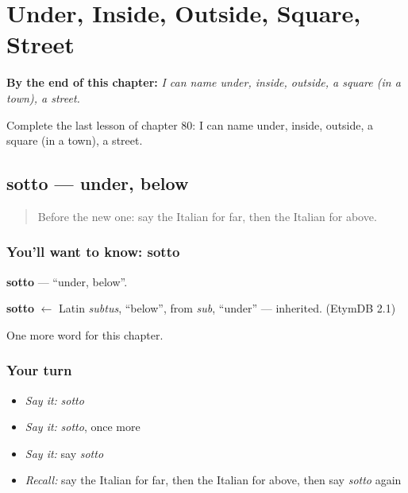 
\chapter{Under, Inside, Outside, Square, Street}
\label{ch:it-under-inside-outside-square-street}

\begin{chapteropening}
\textbf{By the end of this chapter:} \emph{I can name under, inside, outside, a square (in a town), a street.}

Complete the last lesson of chapter 80: I can name under, inside, outside, a square (in a town), a street.
\end{chapteropening}

\section[sotto]{sotto — under, below}

\label{lesson:IT-C80-sotto}



\begin{quote}
Before the new one: say the Italian for far, then the Italian for above.
\end{quote}

\subsection*{You'll want to know: sotto}
\textbf{sotto} — \textquotedblleft{}under, below\textquotedblright{}.

\begin{cousinweb}
\textbf{sotto} $\leftarrow$ Latin \emph{subtus}, \textquotedblleft{}below\textquotedblright{}, from \emph{sub}, \textquotedblleft{}under\textquotedblright{} — inherited. (EtymDB 2.1)
\end{cousinweb}

\begin{grammarlens}[title={What you've built}]
One more word for this chapter.
\end{grammarlens}

\subsection*{Your turn}
\begin{itemize}
\raggedright
  \item \emph{Say it:} \emph{sotto}
  \item \emph{Say it:} \emph{sotto}, once more
  \item \emph{Say it:} say \emph{sotto}
  \item \emph{Recall:} say the Italian for far, then the Italian for above, then say \emph{sotto} again
\end{itemize}

